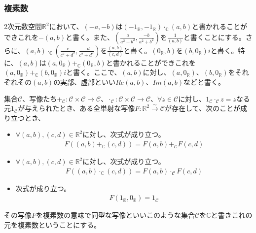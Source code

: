 \documentclass[dvipdfmx]{jsarticle}
\begin{document}
\subsubsection{複素数}%
\begin{dfn}
2次元数空間$\mathbb{R}^{2}$において、$( - a, - b)$は$\left( - 1_{\mathbb{R}}, - 1_{\mathbb{R}} \right) \cdot_{\mathbb{C}}(a,b)$と書かれることができこれを$- (a,b)$と書く。また、$\left( \frac{a}{a^{2} + b^{2}},\frac{- b}{a^{2} + b^{2}} \right)$を$\frac{1}{(a,b)}$と書くことにする。さらに、$(a,b) \cdot_{\mathbb{C}}\left( \frac{c}{c^{2} + d^{2}},\frac{- d}{c^{2} + d^{2}} \right)$を$\frac{(a,b)}{(c,d)}$と書く。$\left( 0_{\mathbb{R}},b \right)$を$\left( b,0_{\mathbb{R}} \right)i$と書く。特に、$(a,b)$は$\left( a,0_{\mathbb{R}} \right) +_{\mathbb{C}}\left( 0_{\mathbb{R}},b \right)$と書かれることができこれを$\left( a,0_{\mathbb{R}} \right) +_{\mathbb{C}}\left( b,0_{\mathbb{R}} \right)i$と書く。ここで、$(a,b)$に対し、$\left( a,0_{\mathbb{R}} \right)$、$\left( b,0_{\mathbb{R}} \right)$をそれぞれその$(a,b)$の実部、虚部といい${Re}(a,b)$、${Im}(a,b)$などと書く。
\end{dfn}
\begin{dfn}
集合$\mathcal{C}$、写像たち$+_{\mathcal{C}}\mathcal{:C \times C \rightarrow C}$、$\cdot_{\mathcal{C}}\mathcal{:C \times C \rightarrow C}$、$\forall z \in \mathcal{C}$に対し、$1_{\mathcal{C}} \cdot_{\mathcal{C}}z = z$なる元$1_{\mathcal{C}}$が与えられたとき、ある全単射な写像$F:\mathbb{R}^{2}\overset{\sim}{\rightarrow}\mathcal{C}$が存在して、次のことが成り立つとき、
\begin{itemize}
\item
  $\forall(a,b),(c,d) \in \mathbb{R}^{2}$に対し、次式が成り立つ。
\begin{align*}
F\left( (a,b) +_{\mathbb{C}}(c,d) \right) = F(a,b) +_{\mathcal{C}}F(c,d)
\end{align*}
\item
  $\forall(a,b),(c,d) \in \mathbb{R}^{2}$に対し、次式が成り立つ。
\begin{align*}
F\left( (a,b) \cdot_{\mathbb{C}}(c,d) \right) = F(a,b) \cdot_{\mathcal{C}}F(c,d)
\end{align*}
\item
  次式が成り立つ。
\begin{align*}
F\left( 1_{\mathbb{R}},0_{\mathbb{R}} \right) = 1_{\mathcal{C}}
\end{align*}
\end{itemize}
その写像$F$を複素数の意味で同型な写像といいこのような集合$\mathcal{C}$を$\mathbb{C}$と書きこれの元を複素数ということにする。
\end{dfn}
\end{document}
